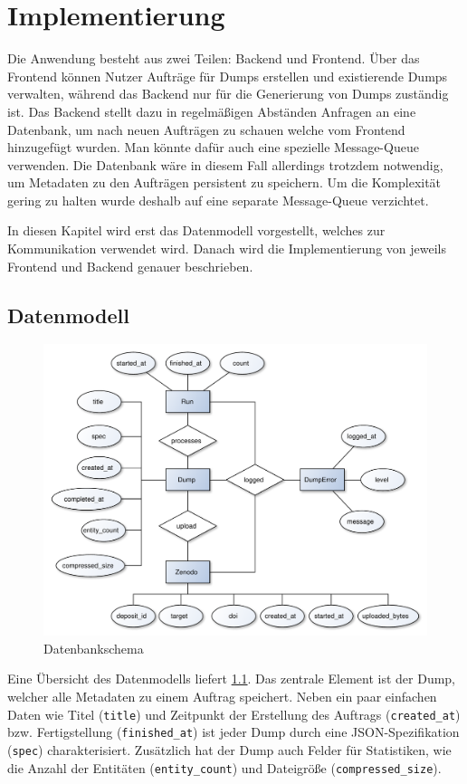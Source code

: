 \chapter{Implementierung}
\label{chap:implementation}

Die Anwendung besteht aus zwei Teilen: Backend und Frontend. Über das Frontend können Nutzer Aufträge für Dumps erstellen und existierende Dumps verwalten, während das Backend nur für die Generierung von Dumps zuständig ist.
Das Backend stellt dazu in regelmäßigen Abständen Anfragen an eine Datenbank, um nach neuen Aufträgen zu schauen welche vom Frontend hinzugefügt wurden.
Man könnte dafür auch eine spezielle Message-Queue verwenden. Die Datenbank wäre in diesem Fall allerdings trotzdem notwendig, um Metadaten zu den Aufträgen persistent zu speichern. Um die Komplexität gering zu halten wurde deshalb auf eine separate Message-Queue verzichtet.

In diesen Kapitel wird erst das Datenmodell vorgestellt, welches zur Kommunikation verwendet wird.
Danach wird die Implementierung von jeweils Frontend und Backend genauer beschrieben.

\section{Datenmodell}
\begin{figure}
  \includegraphics[width=\textwidth]{pics/db-er}
  \caption{Datenbankschema}
  \label{fig:db-er}
\end{figure}
Eine Übersicht des Datenmodells liefert \cref{fig:db-er}.
Das zentrale Element ist der Dump, welcher alle Metadaten zu einem Auftrag speichert.
Neben ein paar einfachen Daten wie Titel (\verb|title|) und Zeitpunkt der Erstellung des Auftrags (\verb|created_at|) bzw. Fertigstellung (\verb|finished_at|) ist jeder Dump durch eine JSON-Spezifikation (\verb|spec|) charakterisiert. Zusätzlich hat der Dump auch Felder für Statistiken, wie die Anzahl der Entitäten (\verb|entity_count|) und Dateigröße (\verb|compressed_size|).

